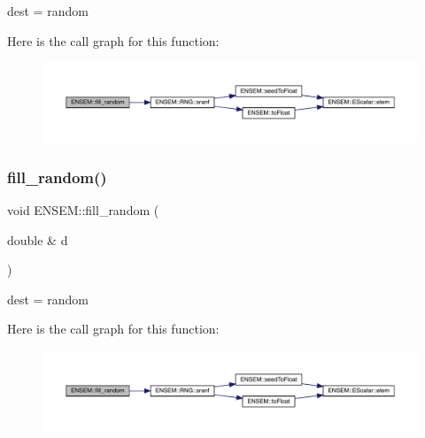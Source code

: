 dest = random 

Here is the call graph for this function\+:\nopagebreak
\begin{figure}[H]
\begin{center}
\leavevmode
\includegraphics[width=350pt]{d2/d94/namespaceENSEM_a6b1e92930b4fcb2ce1fa31cfd98c3e15_cgraph}
\end{center}
\end{figure}
\mbox{\label{namespaceENSEM_a6ff7a31a0fb5d175a3065b60f365fa0d}} 
\subsubsection{\texorpdfstring{fill\_random()}{fill\_random()}\hspace{0.1cm}{\footnotesize\ttfamily [2/2]}}
{\footnotesize\ttfamily void E\+N\+S\+E\+M\+::fill\+\_\+random (\begin{DoxyParamCaption}\item[{double \&}]{d }\end{DoxyParamCaption})\hspace{0.3cm}{\ttfamily [inline]}}



dest = random 

Here is the call graph for this function\+:\nopagebreak
\begin{figure}[H]
\begin{center}
\leavevmode
\includegraphics[width=350pt]{d2/d94/namespaceENSEM_a6ff7a31a0fb5d175a3065b60f365fa0d_cgraph}
\end{center}
\end{figure}
\mbox{\label{namespaceENSEM_adc1e01b99bd6ff80c11a18cf059f00de}} 
